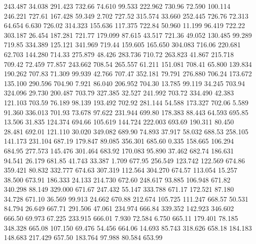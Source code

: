  243.487   34.038  291.423       732.66
  74.610   99.533  222.962       730.96
  72.590  100.114  246.221       727.61
 167.428   59.349    2.702       727.52
 315.574   33.660  252.445       726.76
  72.313   64.654    6.630       726.02
 314.323  155.636  117.375       722.84
  50.960   11.199   96.419       722.22
 303.187   26.454  187.281       721.77
 179.099   87.615   43.517       721.36
  49.052  130.485   99.289       719.85
 334.389  125.121  341.969       719.44
 159.605  165.650  304.083       716.06
 220.681   62.703  144.280       714.33
 275.879   48.426  283.736       710.72
 263.823   41.867  215.718       709.42
  72.459   77.857  243.662       708.54
 265.557   61.211  151.081       708.41
  65.800  139.834  190.262       707.83
  71.309   99.939   42.766       707.47
 352.181   79.791  276.880       706.24
 173.672  135.100  290.596       704.90
   7.921   86.040  206.952       704.30
  13.785   99.119   34.245       703.94
 324.096   29.730  200.487       703.79
 327.385   32.527  241.992       703.72
 334.490   42.383  121.103       703.59
  76.189   98.139  193.492       702.92
 281.144   54.588  173.327       702.06
   5.589   91.360  336.013       701.93
  73.678   97.622  231.944       699.80
 178.383   88.443   64.593       695.85
  13.506   31.835  124.374       694.66
 105.619  144.724  222.003       693.69
 190.311   80.450   28.481       692.01
 121.110   30.020  349.082       689.90
  74.893   37.917   58.032       688.53
 258.105  141.173  231.104       687.19
 179.847   89.085  356.301       685.60
   0.335  158.665  106.294       684.95
 277.573  145.476  301.464       683.92
 170.083   95.890   37.462       682.74
 186.631   94.541   26.179       681.85
  41.743   33.387    1.709       677.95
 256.549  123.742  122.569       674.86
 359.421   80.832  332.777       674.63
 307.319  112.564  304.270       674.57
 113.054   15.257   38.500       673.91
 186.333   24.133  214.730       672.60
 248.617   93.885  106.948       671.82
 340.298   88.149  329.000       671.67
 247.432   55.147  333.788       671.17
 172.521   87.180   34.728       671.10
  36.569   99.913   24.662       670.88
 212.674  105.725  111.247       668.57
  50.531   84.794   26.649       667.71
 291.506   47.061  234.974       666.84
 339.352  142.923  346.602       666.50
  69.973   67.225  233.915       666.01
   7.930   72.584    6.750       665.11
 179.401   78.185  348.328       665.08
 107.150   69.476   54.456       664.06
  14.693   85.743  318.626       658.18
 184.183  148.683  217.429       657.50
 183.764   97.988   80.584       653.99
